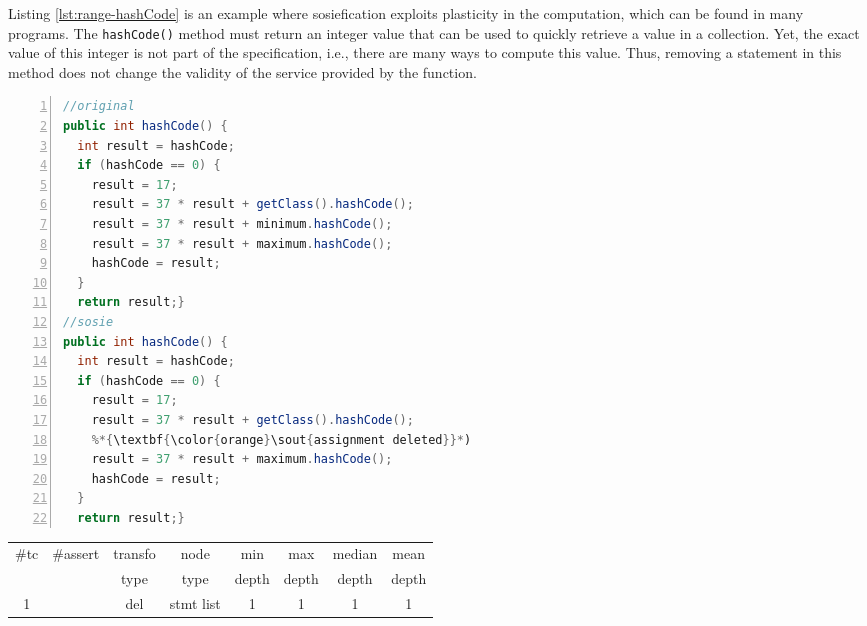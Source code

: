 Listing \ref{lst:range-hashCode} is an example where sosiefication exploits plasticity in the computation, which can be found in many programs. 
The \texttt{hashCode()} method must return an integer value that can be used to quickly retrieve a value in a collection. Yet, the exact value of this integer is not part of the specification, i.e., there are many ways to compute this value. 
Thus, removing a statement in this method does not change the validity of the service provided by the function. 

\begin{minipage}{\columnwidth}
\begin{lstlisting}[caption={\texttt{hashCode} in commons.lang and a sosie},label={lst:range-hashCode},language=java,numbers=left]
//original
public int hashCode() {
  int result = hashCode;
  if (hashCode == 0) {
    result = 17;
    result = 37 * result + getClass().hashCode();
    result = 37 * result + minimum.hashCode();
    result = 37 * result + maximum.hashCode();
    hashCode = result;
  }
  return result;}
//sosie
public int hashCode() {
  int result = hashCode;
  if (hashCode == 0) {
    result = 17;
    result = 37 * result + getClass().hashCode();
    %*{\textbf{\color{orange}\sout{assignment deleted}}*)
    result = 37 * result + maximum.hashCode();
    hashCode = result;
  }
  return result;}
\end{lstlisting}
\tabcolsep=0.11cm
\begin{tabular}{>{\small}c>{\small}c>{\small}c>{\small}c>{\small}c>{\small}c>{\small}c>{\small}c}
\hline
\rowcolor{lightgray} \#tc & \#assert & transfo & node & min & max & median & mean   \\
\rowcolor{lightgray}  & & type & type & depth  & depth & depth & depth  \\ 
\hline
1&  & del & stmt list &1  &1  &1  &1 \\
\hline
\end{tabular}
\end{minipage}